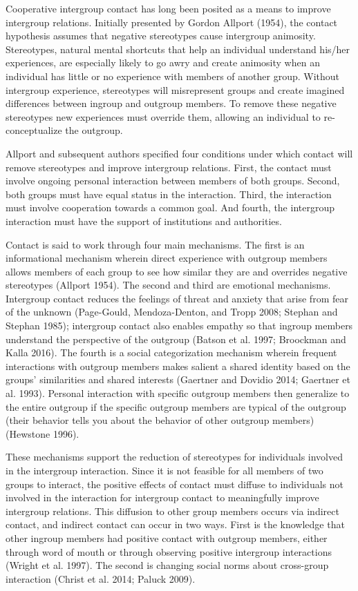 \documentclass[11pt]{article}
\begin{document}
Cooperative intergroup contact has long been posited as a means to
improve intergroup relations. Initially presented by Gordon Allport
(1954), the contact hypothesis assumes that negative stereotypes cause
intergroup animosity. Stereotypes, natural mental shortcuts that help an
individual understand his/her experiences, are especially likely to go
awry and create animosity when an individual has little or no experience
with members of another group. Without intergroup experience,
stereotypes will misrepresent groups and create imagined differences
between ingroup and outgroup members. To remove these negative
stereotypes new experiences must override them, allowing an individual
to re-conceptualize the outgroup.

Allport and subsequent authors specified four conditions under which
contact will remove stereotypes and improve intergroup relations. First,
the contact must involve ongoing personal interaction between members of
both groups. Second, both groups must have equal status in the
interaction. Third, the interaction must involve cooperation towards a
common goal. And fourth, the intergroup interaction must have the
support of institutions and authorities.

Contact is said to work through four main mechanisms. The first is an
informational mechanism wherein direct experience with outgroup members
allows members of each group to see how similar they are and overrides
negative stereotypes (Allport 1954). The second and third are emotional
mechanisms. Intergroup contact reduces the feelings of threat and
anxiety that arise from fear of the unknown (Page-Gould, Mendoza-Denton,
and Tropp 2008; Stephan and Stephan 1985); intergroup contact also
enables empathy so that ingroup members understand the perspective of
the outgroup (Batson et al. 1997; Broockman and Kalla 2016). The fourth
is a social categorization mechanism wherein frequent interactions with
outgroup members makes salient a shared identity based on the groups'
similarities and shared interests (Gaertner and Dovidio 2014; Gaertner
et al. 1993). Personal interaction with specific outgroup members then
generalize to the entire outgroup if the specific outgroup members are
typical of the outgroup (their behavior tells you about the behavior of
other outgroup members) (Hewstone 1996).

These mechanisms support the reduction of stereotypes for individuals
involved in the intergroup interaction. Since it is not feasible for all
members of two groups to interact, the positive effects of contact must
diffuse to individuals not involved in the interaction for intergroup
contact to meaningfully improve intergroup relations. This diffusion to
other group members occurs via indirect contact, and indirect contact
can occur in two ways. First is the knowledge that other ingroup members
had positive contact with outgroup members, either through word of mouth
or through observing positive intergroup interactions (Wright et al.
1997). The second is changing social norms about cross-group interaction
(Christ et al. 2014; Paluck 2009).
\end{document}
